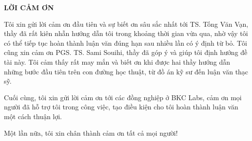 \documentclass[../main.tex]{subfiles}
\begin{document}
\begin{center}
  \Large{\textbf{LỜI CẢM ƠN}}\\
\end{center}
\vspace{1cm}
Tôi xin gửi lời cảm ơn đầu tiên và sự biết ơn sâu sắc nhất tới TS. Tống Văn Vạn, thầy đã rất kiên nhẫn hướng dẫn tôi trong khoảng thời gian vừa qua, nhờ vậy tôi có thể tiếp tục hoàn thành luận văn đúng hạn sau nhiều lần có ý định từ bỏ. Tôi cũng xin cảm ơn PGS. TS. Sami Souihi, thầy đã góp ý và giúp tôi định hướng đề tài này. Tôi cảm thấy rất may mắn và biết ơn khi được hai thầy hướng dẫn những bước đầu tiên trên con đường học thuật, từ đồ án kỹ sư đến luận văn thạc sỹ.

Cuối cùng, tôi xin gửi lời cảm ơn tới các đồng nghiệp ở BKC Labs, cảm ơn mọi người đã hỗ trợ tôi trong công việc, tạo điều kiện cho tôi hoàn thành luận văn một cách thuận lợi.

Một lần nữa, tôi xin chân thành cảm ơn tất cả mọi người!
\end{document}
